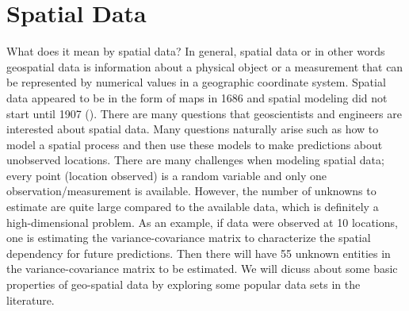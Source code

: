 
%
%
%
%

% 
% 

\section{Spatial Data}

What does it mean by spatial data? In general, spatial data or in other words geospatial data is information about a physical object or a measurement that can be represented by numerical values in a geographic coordinate system. Spatial data appeared to be in the form of maps in 1686 and spatial modeling did not start until 1907 (\cite{Cressie1993}). There are many questions that geoscientists and engineers are interested about spatial data. Many questions naturally arise such as how to model a spatial process and then use these models to make predictions about unobserved locations. There are many challenges when modeling spatial data; every point (location observed) is a random variable and only one observation/measurement is available. However, the number of unknowns to estimate are quite large compared to the available data, which is definitely a high-dimensional problem. As an example, if data were observed at 10 locations, one is estimating the variance-covariance matrix to characterize the spatial dependency for future predictions. Then there will have 55 unknown entities in the variance-covariance matrix to be estimated. We will dicuss about some basic properties of geo-spatial data by exploring some popular data sets in the literature. \\




